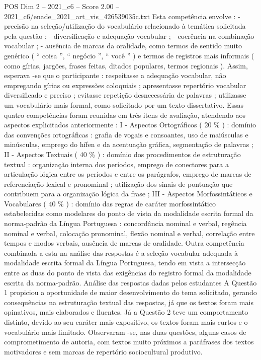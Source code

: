 \begin{textsample}{POS Dim 2 – 2021\_c6 – Score 2.00 – 2021\_c6/enade\_2021\_art\_vis\_426539035c.txt}
Esta competência envolve : - precisão na seleção/utilização do vocabulário relacionado à temática solicitada pela questão ; - diversificação e adequação vocabular ; - coerência na combinação vocabular ; - ausência de marcas da oralidade, como termos de sentido muito genérico ( “ coisa ”, “ negócio ”, “ você ” ) e termos de registros mais informais ( como gírias, jargões, frases feitas, ditados populares, termos regionais ).
Assim, esperava -se que o participante : respeitasse a adequação vocabular, não empregando gírias ou expressões coloquiais ; apresentasse repertório vocabular diversificado e preciso ; evitasse repetição desnecessária de palavras ; utilizasse um vocabulário mais formal, como solicitado por um texto dissertativo.
Essas quatro competências foram reunidas em três itens de avaliação, atendendo aos aspectos explicitados anteriormente : I - Aspectos Ortográficos ( 20 \% ) : domínio das convenções ortográficas : grafia de vogais e consoantes, uso de maiúsculas e minúsculas, emprego do hífen e da acentuação gráfica, segmentação de palavras ; II - Aspectos Textuais ( 40 \% ) : domínio dos procedimentos de estruturação textual : organização interna dos períodos, emprego de conectores para a articulação lógica entre os períodos e entre os parágrafos, emprego de marcas de referenciação lexical e pronominal ; utilização dos sinais de pontuação que contribuem para a organização lógica da frase ; III - Aspectos Morfossintáticos e Vocabulares ( 40 \% ) : domínio das regras de caráter morfossintático estabelecidas como modelares do ponto de vista da modalidade escrita formal da norma-padrão da Língua Portuguesa : concordância nominal e verbal, regência nominal e verbal, colocação pronominal, flexão nominal e verbal, correlação entre tempos e modos verbais, ausência de marcas de oralidade.
Outra competência combinada a esta na análise das respostas é a seleção vocabular adequada à modalidade escrita formal da Língua Portuguesa, tendo em vista a intersecção entre as duas do ponto de vista das exigências do registro formal da modalidade escrita da norma-padrão.
Análise das respostas dadas pelos estudantes A Questão 1 propiciou a oportunidade de maior desenvolvimento do tema solicitado, gerando consequências na estruturação textual das respostas, já que os textos foram mais opinativos, mais elaborados e fluentes.
Já a Questão 2 teve um comportamento distinto, devido ao seu caráter mais expositivo, os textos foram mais curtos e o vocabulário mais limitado.
Observaram -se, nas duas questões, alguns casos de comprometimento de autoria, com textos muito próximos a paráfrases dos textos motivadores e sem marcas de repertório sociocultural produtivo.

\end{textsample}
